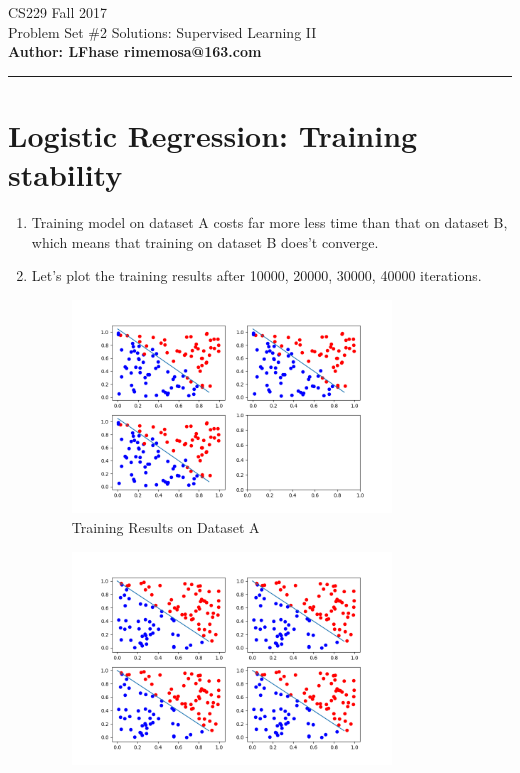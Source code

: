 \documentclass[12pt]{article}
\begin{document}
    \begin{flushleft}
    \LARGE CS229 Fall 2017\\
    \LARGE Problem Set \#2 Solutions:  Supervised Learning II    \\
    \textbf{\normalsize Author: LFhase \quad rimemosa@163.com}
    \end{flushleft} 
    \noindent
    \rule{\linewidth}{0.4pt}


    \section*{Logistic Regression: Training stability  }

    \begin{enumerate}[label=(\alph*)]
    \item Training model on dataset A costs far more less time than that on dataset B, which means that training on dataset B does't converge.
    \item 
    Let's plot the training results after 10000, 20000, 30000, 40000 iterations.
    \begin{figure}[H]
        \centering
        \includegraphics[width=0.80\textwidth]{Q1/training_dsA.png}
        \caption{Training Results on Dataset A}
    \end{figure}
    \begin{figure}[H]
        \centering
        \includegraphics[width=0.80\textwidth]{Q1/training_dsB.png}

\end{figure}
\end{enumerate}
\end{document}
